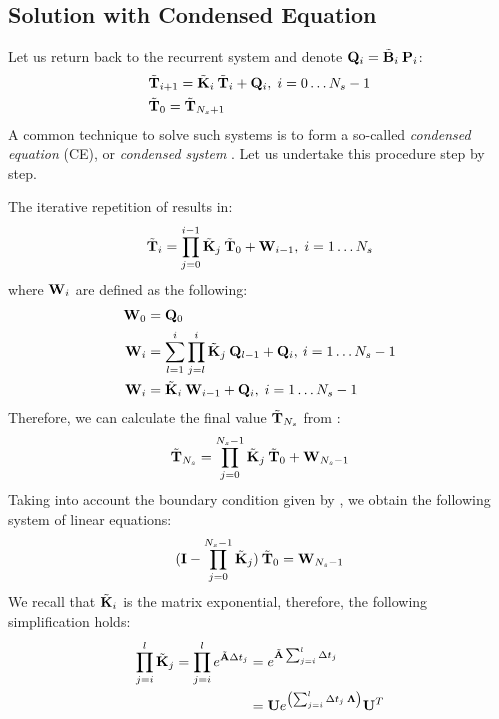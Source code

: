\subsection{Solution with Condensed Equation}
Let us return back to the recurrent system and denote \mbox{$\mathbf{Q}_i = \tilde{\mathbf{B}}_i \: \mathbf{P}_i$}:
\begin{align}
  & \tilde{\mathbf{T}}_{i + 1} = \tilde{\mathbf{K}}_i \: \tilde{\mathbf{T}}_i + \mathbf{Q}_i, \; i = 0 \dots N_s - 1 \label{eq:ce-recurrent} \\
  & \tilde{\mathbf{T}}_0 = \tilde{\mathbf{T}}_{N_s + 1} \nonumber
\end{align}
A common technique to solve such systems is to form a so-called \emph{condensed equation} (CE), or \emph{condensed system} \cite{stoer2002}. Let us undertake this procedure step by step.

The iterative repetition of  results in:
\begin{equation} \label{eq:y-recurrent}
  \tilde{\mathbf{T}}_i = \prod_{j = 0}^{i - 1} \tilde{\mathbf{K}}_j \: \tilde{\mathbf{T}}_0 + \mathbf{W}_{i - 1}, \; i = 1 \dots N_s
\end{equation}
where $\mathbf{W}_i$ are defined as the following:
\begin{align}
  \mathbf{W}_0 & = \mathbf{Q}_0 \nonumber \\
  \mathbf{W}_i & = \sum_{l = 1}^i \prod_{j = l}^i \tilde{\mathbf{K}}_j \: \mathbf{Q}_{l - 1} + \mathbf{Q}_i, \: i = 1 \dots N_s - 1 \nonumber \\
  \mathbf{W}_i & = \tilde{\mathbf{K}}_i \: \mathbf{W}_{i - 1} + \mathbf{Q}_i, \; i = 1 \dots N_s - 1 \label{eq:p-recurrent}
\end{align}
Therefore, we can calculate the final value $\tilde{\mathbf{T}}_{N_s}$ from :
\[
  \tilde{\mathbf{T}}_{N_s} = \prod_{j = 0}^{N_s - 1} \tilde{\mathbf{K}}_j \: \tilde{\mathbf{T}}_0 + \mathbf{W}_{N_s - 1}
\]
Taking into account the boundary condition given by , we obtain the following system of linear equations:
\begin{equation} \label{eq:core-system}
  (\mathbf{I} - \prod_{j = 0}^{N_s - 1} \tilde{\mathbf{K}}_j) \: \tilde{\mathbf{T}}_0 = \mathbf{W}_{N_s - 1}
\end{equation}
We recall that $\tilde{\mathbf{K}}_i$ is the matrix exponential, therefore, the following simplification holds:
\begin{align*}
  \prod_{j = i}^l \tilde{\mathbf{K}}_j = \prod_{j = i}^l e^{\tilde{\mathbf{A}} \Delta t_j} & = e^{\tilde{\mathbf{A}} \sum_{j = i}^l \Delta t_j} \\
  & = \mathbf{U} e^{\left( \sum_{j = i}^l \Delta t_j \: \mathbf{\Lambda} \right)} \mathbf{U}^T
\end{align*}

